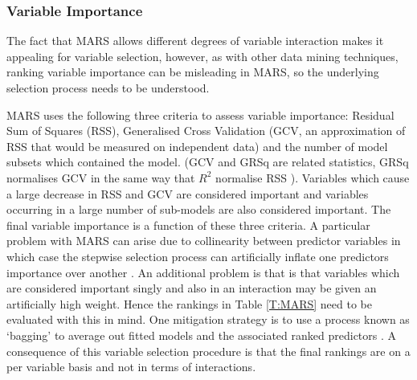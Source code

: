 \documentclass[a4paper, 12pt]{report}
\begin{document}
\subsubsection{Variable Importance}
The fact that MARS allows different degrees of variable interaction makes it appealing for variable selection, however, as with other data mining techniques, ranking variable importance can be misleading in MARS, so the underlying selection process needs to be understood. 

MARS uses the following three criteria to assess variable importance: Residual Sum of Squares (RSS), Generalised Cross Validation (GCV, an approximation of RSS that would be measured on independent data) and the number of model subsets which contained the model. (GCV and GRSq are related statistics, GRSq normalises GCV in the same way that $R^2$ normalise RSS \cite{earth}). Variables which cause a large decrease in RSS and GCV are considered important and variables occurring in a large number of sub-models are also considered important. The final variable importance is a function of these three criteria. A particular problem with MARS can arise due to collinearity between predictor variables in which case the stepwise selection process can artificially inflate one predictors importance over another \cite{earth}. An additional problem is that is that variables which are considered important singly and also in an interaction may be given an artificially high weight. Hence the rankings in Table \ref{T:MARS} need to be evaluated with this in mind. One mitigation strategy is to use a process known as `bagging' to average out fitted models and the associated ranked predictors \cite{earth}. A consequence of this variable selection procedure is that the final rankings are on a per variable basis and not in terms of interactions. 
\end{document}
